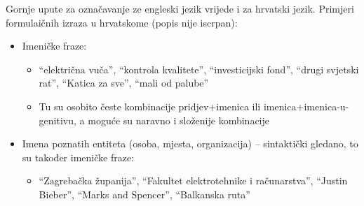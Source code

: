 \documentclass[12pt]{article}
\begin{document}
\maketitle
 

Gornje upute za označavanje ze engleski jezik vrijede i za hrvatski jezik. Primjeri formulaičnih izraza u
hrvatskome (popis nije iscrpan):


\begin{itemize}
\item Imeničke fraze:
\begin{itemize}
\item ``električna vuča'', ``kontrola kvalitete'', ``investicijski fond'', ``drugi svjetski rat'', ``Katica
za sve'', ``mali od palube''
\item Tu su osobito česte kombinacije pridjev+imenica ili imenica+imenica-u-genitivu, a moguće su
naravno i složenije kombinacije
\end{itemize}
\item Imena poznatih entiteta (osoba, mjesta, organizacija) – sintaktički gledano, to su također imeničke
fraze:
\begin{itemize}
\item ``Zagrebačka županija'', ``Fakultet elektrotehnike i računarstva'', ``Justin Bieber'', ``Marks
and Spencer'', ``Balkanska ruta''
\end{itemize}


\end{itemize}
\end{document}
